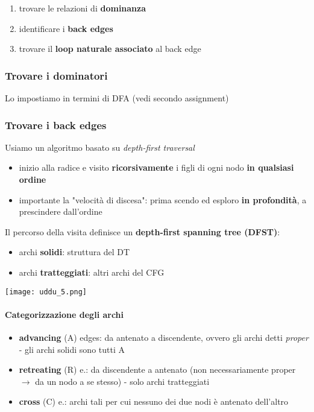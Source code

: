 \begin{enumerate}
  \item trovare le relazioni di \textbf{dominanza}
  \item identificare i \textbf{back edges}
  \item trovare il \textbf{loop naturale associato} al back edge
\end{enumerate}

\subsubsection{Trovare i dominatori}

Lo impostiamo in termini di DFA (vedi secondo assignment)

\subsubsection{Trovare i back edges}

\noindent \begin{minipage}[c]{.67\textwidth}
Usiamo un algoritmo basato su \textit{depth-first traversal
}
\begin{itemize}
  \item inizio alla radice e visito \textbf{ricorsivamente} i figli di ogni nodo \textbf{in qualsiasi ordine}
  \item importante la "velocit\`a di discesa": prima scendo ed esploro \textbf{in profondit\`a}, a prescindere dall'ordine
\end{itemize}

Il percorso della visita definisce un \textbf{depth-first spanning tree (DFST)}:
\begin{itemize}
  \item archi \textbf{solidi}: struttura del DT
  \item archi \textbf{tratteggiati}: altri archi del CFG
\end{itemize}
\end{minipage}\hfill
\begin{minipage}[c]{.3\textwidth}
\texttt{[image: uddu\_5.png]}
\end{minipage}

\paragraph{Categorizzazione degli archi}

\begin{itemize}
  \item \textbf{advancing} (A) edges: da antenato a discendente, ovvero gli archi detti \textit{proper} - gli archi solidi sono tutti A
  \item \textbf{retreating} (R) e.: da discendente a antenato (non necessariamente proper $\rightarrow$ da un nodo a se stesso) - solo archi tratteggiati
  \item \textbf{cross} (C) e.: archi tali per cui nessuno dei due nodi \`e antenato dell'altro
\end{itemize}

